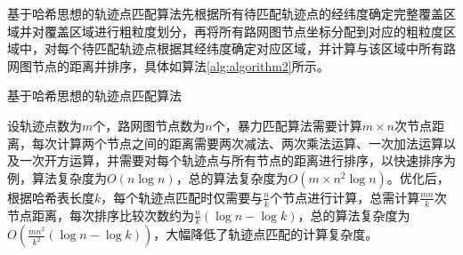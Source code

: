 \documentclass[master]{thesis-uestc}
\begin{document}
基于哈希思想的轨迹点匹配算法先根据所有待匹配轨迹点的经纬度确定完整覆盖区域并对覆盖区域进行粗粒度划分，再将所有路网图节点坐标分配到对应的粗粒度区域中，对每个待匹配轨迹点根据其经纬度确定对应区域，并计算与该区域中所有路网图节点的距离并排序，具体如算法\ref{alg:algorithm2}所示。
\begin{algorithm}[!ht]
\SetAlgoLined
{}
\Begin{
    初始化$\lceil(\mathcal{L}ati_{max}-\mathcal{L}ati_{min})\div \delta \rceil \times \lceil(\mathcal{L}ongi_{max}-\mathcal{L}ongi_{min})\div \delta \rceil = \Theta$个数组$\mathcal{A}rray = \{A_1,A_2,\dots,A_{\theta}\}$\\
    \While{$\tau \in  (0,n]$}{
        计算每个节点对应的数组并修改对应数组\\
        使用粒度$\delta$和最大经纬度$\mathcal{L}ati_{max},\mathcal{L}ongi_{max}$计算对应的数组编号$\theta$\\
        修改对应数组$A_{\theta}$中的值，增加对应节点信息\\
    }
    计算轨迹点坐标对应的数组编号$\theta^{\prime}$\\
    \ForEach{$(x_{\tau},y_{\tau}) \in A_{\theta^{\prime}}$}{
        计算轨迹点$(x,y)$与$(x_{\tau},y_{\tau})$的距离，在对应数组$A_{\hat{\theta}}$中保存距离值和编号$l_{\tau}$\\
    }
    对数组$A_{\hat{\theta}}$中的值进行排序\\
    输出最短距离的节点编号$\mathcal{L}$\\
}
\caption{基于哈希思想的轨迹点匹配算法}
\label{alg:algorithm2}
\end{algorithm}

设轨迹点数为$m$个，路网图节点数为$n$个，暴力匹配算法需要计算$m\times n$次节点距离，每次计算两个节点之间的距离需要两次减法、两次乘法运算、一次加法运算以及一次开方运算，并需要对每个轨迹点与所有节点的距离进行排序，以快速排序为例，算法复杂度为$O(n\log n)$，总的算法复杂度为$O(m\times n^2 \log n)$。优化后，根据哈希表长度$k$，每个轨迹点匹配时仅需要与$\frac{n}{k}$个节点进行计算，总需计算$\frac{mn}{k}$次节点距离，每次排序比较次数约为$\frac{n}{k}(\log n- \log k)$，总的算法复杂度为$O(\frac{mn^2}{k^2}(\log n -\log k))$，大幅降低了轨迹点匹配的计算复杂度。
\end{document}
